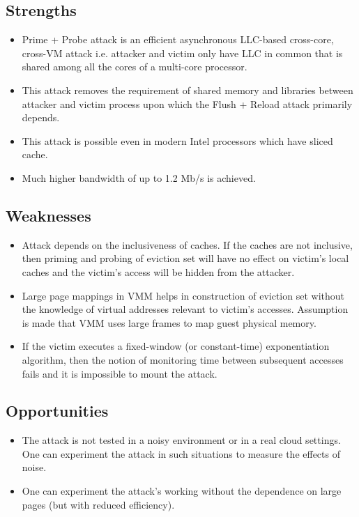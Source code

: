\documentclass[a4paper,12pt, final]{report}
\begin{document}
\subsection{Strengths}

\begin{itemize}
    \item Prime + Probe attack is an efficient asynchronous LLC-based cross-core, cross-VM attack i.e. attacker and victim only have LLC in common that is shared among all the cores of a multi-core processor.
    \item This attack removes the requirement of shared memory and libraries between attacker and victim process upon which the Flush + Reload attack primarily depends.
    \item This attack is possible even in modern Intel processors which have sliced cache.
    \item Much higher bandwidth of up to 1.2 Mb/s is achieved.
\end{itemize}

\subsection{Weaknesses}

\begin{itemize}
    \item Attack depends on the inclusiveness of caches. If the caches are not inclusive, then priming and probing of eviction set will have no effect on victim's local caches and the victim's access will be hidden from the attacker.
    \item Large page mappings in VMM helps in construction of eviction set without the knowledge of virtual addresses relevant to victim's accesses. Assumption is made that VMM uses large frames to map guest physical memory.
    \item If the victim executes a fixed-window (or constant-time) exponentiation algorithm, then the notion of monitoring time between subsequent accesses fails and it is impossible to mount the attack.
\end{itemize}

\subsection{Opportunities}

\begin{itemize}
    \item The attack is not tested in a noisy environment or in a real cloud settings. One can experiment the attack in such situations to measure the effects of noise.
    \item One can experiment the attack's working without the dependence on large pages (but with reduced efficiency).
\end{itemize}
\end{document}
